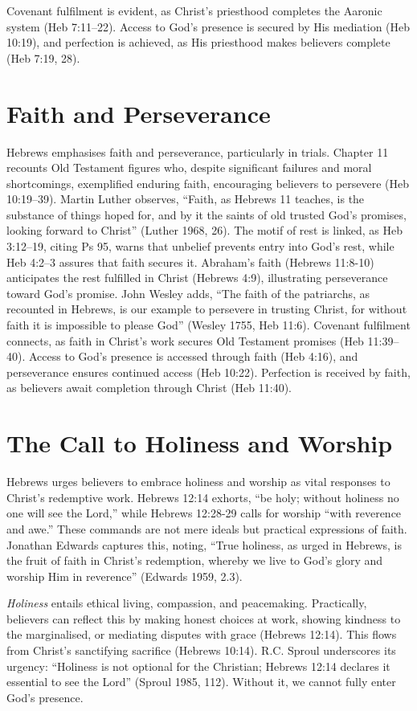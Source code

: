 \documentclass[12pt]{article}
\begin{document}
Covenant fulfilment is evident, as Christ’s priesthood completes the Aaronic
system (Heb 7:11--22). Access to God’s presence is secured by His mediation (Heb
10:19), and perfection is achieved, as His priesthood makes believers complete
(Heb 7:19, 28).

\section{Faith and Perseverance}
Hebrews emphasises faith and perseverance, particularly in trials. Chapter 11
recounts Old Testament figures who, despite significant failures and moral
shortcomings, exemplified enduring faith, encouraging believers to persevere
(Heb 10:19--39). Martin Luther observes, ``Faith, as Hebrews 11 teaches, is the
substance of things hoped for, and by it the saints of old trusted God’s
promises, looking forward to Christ'' (Luther 1968, 26). The motif of rest is
linked, as Heb 3:12--19, citing Ps 95, warns that unbelief prevents entry into
God’s rest, while Heb 4:2--3 assures that faith secures it. Abraham’s faith
(Hebrews 11:8-10) anticipates the rest fulfilled in Christ (Hebrews 4:9),
illustrating perseverance toward God’s promise. John Wesley adds,
``The faith of the patriarchs, as recounted in Hebrews, is our example to
persevere in trusting Christ, for without faith it is impossible to please
God'' (Wesley 1755, Heb 11:6). Covenant fulfilment connects, as faith in
Christ’s work secures Old Testament promises (Heb 11:39--40). Access to God’s
presence is accessed through faith (Heb 4:16), and perseverance ensures
continued access (Heb 10:22). Perfection is received by faith, as believers
await completion through Christ (Heb 11:40).

\section{The Call to Holiness and Worship}
Hebrews urges believers to embrace holiness and worship as vital responses to
Christ’s redemptive work. Hebrews 12:14 exhorts, ``be holy; without holiness no
one will see the Lord,'' while Hebrews 12:28-29 calls for worship ``with
reverence and awe.'' These commands are not mere ideals but practical
expressions of faith.  Jonathan Edwards captures this, noting, ``True holiness,
as urged in Hebrews, is the fruit of faith in Christ’s redemption, whereby we
live to God’s glory and worship Him in reverence'' (Edwards 1959, 2.3).

\emph{Holiness} entails ethical living, compassion, and peacemaking.
Practically, believers can reflect this by making honest choices at work,
showing kindness to the marginalised, or mediating disputes with grace (Hebrews
12:14). This flows from Christ’s sanctifying sacrifice (Hebrews 10:14). R.C.
Sproul underscores its urgency: ``Holiness is not optional for the Christian;
Hebrews 12:14 declares it essential to see the Lord'' (Sproul 1985, 112).
Without it, we cannot fully enter God’s presence.
\end{document}
